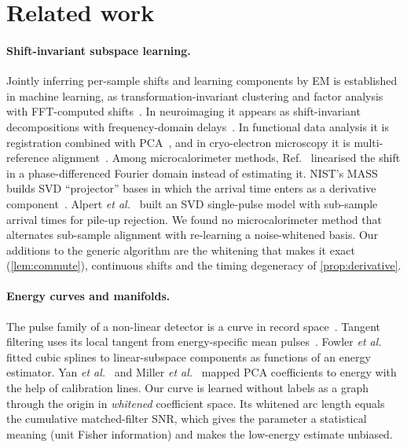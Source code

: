 \documentclass[aps,prapplied,reprint,superscriptaddress,longbibliography,nofootinbib]{revtex4-2}
\theoremstyle{remark}
\begin{document}
\section{Related work}
\label{sec:related}

\paragraph{Shift-invariant subspace learning.} Jointly inferring per-sample shifts
and learning components by EM is established in machine learning, as
transformation-invariant clustering and factor analysis with FFT-computed
shifts~\cite{FreyJojic2003,Kannan2002}. In neuroimaging it appears as shift-invariant
decompositions with frequency-domain delays~\cite{Morup2008}. In functional data
analysis it is registration combined with PCA~\cite{KneipRamsay2008}, and in
cryo-electron microscopy it is multi-reference alignment~\cite{Sigworth1998}. Among
microcalorimeter methods, Ref.~\cite{Yu2019} linearised the shift in a
phase-differenced Fourier domain instead of estimating it. NIST's MASS
builds SVD ``projector'' bases in which the arrival time enters as a derivative
component~\cite{mass,Fowler2016practice,Fowler2020rpca}. Alpert
\emph{et al.}~\cite{Alpert2016} built an SVD single-pulse model with sub-sample
arrival times for pile-up rejection. We found no microcalorimeter method that
alternates sub-sample alignment with re-learning a noise-whitened basis. Our
additions to the generic algorithm are the whitening that makes it exact
(\cref{lem:commute}), continuous shifts and the timing degeneracy of
\cref{prop:derivative}.

\paragraph{Energy curves and manifolds.} The pulse family of a non-linear detector
is a curve in record space~\cite{Fixsen2014}. Tangent filtering uses its local
tangent from energy-specific mean pulses~\cite{Fowler2017tangent}. Fowler
\emph{et al.}~\cite{Fowler2018nonlinear} fitted cubic splines to linear-subspace
components as functions of an energy estimator. Yan \emph{et al.}~\cite{Yan2016} and
Miller \emph{et al.}~\cite{Miller2021} mapped PCA coefficients to energy with the
help of calibration lines. Our curve is learned without labels as a graph through
the origin in \emph{whitened} coefficient space. Its whitened arc length equals the
cumulative matched-filter SNR, which gives the parameter a statistical meaning
(unit Fisher information) and makes the low-energy estimate unbiased.
\end{document}
